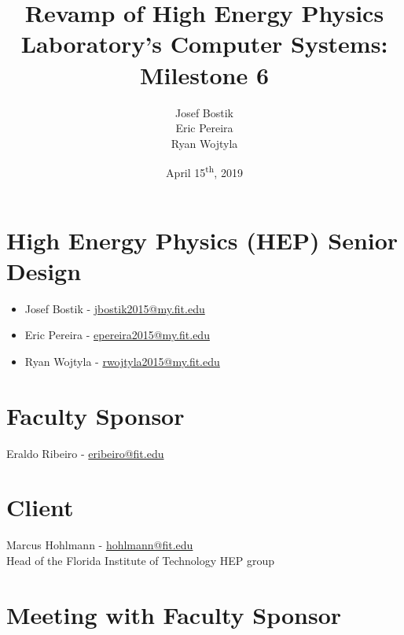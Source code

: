 \documentclass[12pt]{article}
\newcommand\tab[1][1cm]{\hspace*{#1}}
\begin{document}
	

\begin{titlepage}
	
\author{Josef Bostik\\
	Eric Pereira\\
	Ryan Wojtyla\\}
\date{April 15\textsuperscript{th}, 2019}
\title{Revamp of High Energy Physics Laboratory's Computer Systems: Milestone 6}

\maketitle

\end{titlepage}

\tableofcontents

\newpage {}

\section{High Energy Physics (HEP) Senior Design}

\begin{itemize}
	\item Josef Bostik - \href{mailto:jbostik2015@my.fit.edu}{jbostik2015@my.fit.edu}
	\item Eric Pereira - \href{mailto:epereira2015@my.fit.edu}{epereira2015@my.fit.edu}
	\item Ryan Wojtyla - \href{mailto:rwojtyla2015@my.fit.edu}{rwojtyla2015@my.fit.edu}
\end{itemize}

\section{Faculty Sponsor}

\tab Eraldo Ribeiro - \href{mailto:eribeiro@fit.edu}{eribeiro@fit.edu}

\section{Client}

\tab Marcus Hohlmann - \href{mailto:hohlmann@fit.edu}{hohlmann@fit.edu} \\ 
\tab Head of the Florida Institute of Technology HEP group

\section{Meeting with Faculty Sponsor}
\end{document}
